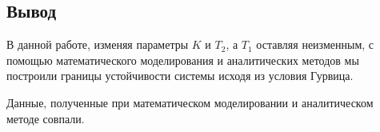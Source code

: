 \documentclass[a4paper, 11pt]{article}
\begin{document}
\newpage 
	\begin{center}
		\section*{Вывод}
	\end{center}\hfill\par
В данной работе, изменяя параметры $K$ и $T_2$, а $T_1$ оставляя неизменным, с помощью математического моделирования и аналитических методов мы построили границы устойчивости системы исходя из условия Гурвица.

Данные, полученные при математическом моделировании и аналитическом методе совпали.
\end{document}
